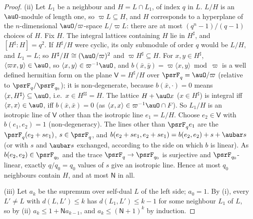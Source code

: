 \documentclass[10pt]{amsart}
\theoremstyle{definition}
\theoremstyle{remark}
\begin{document}
\begin{proof}
(ii) Let $L_1$ be a neighbour and $H=L\cap L_1$, of index $q$ in $L$. $L/H$ is an $\auO$-module of
length one, so $\varpi L\subseteq H$, and $H$ corresponds to a hyperplane of the $n$-dimensional
$\auO/\varpi$-space $L/\varpi L$: there are at most $(q^n-1)/(q-1)$ choices of $H$. Fix $H$. The
integral lattices containing $H$ lie in $H^\sharp$, and $[H^\sharp:H]=q^2$. If $H^\sharp/H$ were
cyclic, its only submodule of order $q$ would be $L/H$, and $L_1=L$; so $H^\sharp/H\cong(\auO/\varpi)^2$
and $\varpi H^\sharp\subseteq H$. For $x,y\in H^\sharp$, $\langle\varpi x,y\rangle\in\auO$, so
$\langle x,y\rangle\in\varpi^{-1}\auO$, and $b(\bar x,\bar y)=\varpi\langle x,y\rangle\bmod\varpi$ is a
well defined hermitian form on the plane $\mathsf V=H^\sharp/H$ over $\psrF_q=\auO/\varpi$ (relative to
$\psrF_q/\psrF_{q_0}$); it is non-degenerate, because $b(\bar x,\cdot)=0$ means $\langle x,
H^\sharp\rangle\subseteq\auO$, i.e.\ $x\in H^{\sharp\sharp}=H$. The lattice $H+\auO x$ ($x\in H^\sharp$)
is integral iff $\langle x,x\rangle\in\auO$, iff $b(\bar x,\bar x)=0$ (as $\langle x,x\rangle\in
\varpi^{-1}\auO\cap F$). So $L_1/H$ is an isotropic line of $\mathsf V$ other than the isotropic line
$e_1=L/H$. Choose $e_2\in\mathsf V$ with $b(e_1,e_2)=1$ (non-degeneracy). The lines other than $\psrF_q e_1$ are
the $\psrF_q(e_2+se_1)$, $s\in\psrF_q$, and $b(e_2+se_1,e_2+se_1)=b(e_2,e_2)+s+\aubar s$ (or with $s$
and $\aubar s$ exchanged, according to the side on which $b$ is linear). As $b(e_2,e_2)\in\psrF_{q_0}$ and
the trace $\psrF_q\to\psrF_{q_0}$ is surjective and $\psrF_{q_0}$-linear, exactly $q/q_0=q_0$ values of $s$
give an isotropic line. Hence at most $q_0$ neighbours contain $H$, and at most $\mathsf N$ in all.

(iii) Let $a_k$ be the supremum over self-dual $L$ of the left side; $a_0=1$. By (i), every $L'\ne L$
with $d(L,L')\le k$ has $d(L_1,L')\le k-1$ for some neighbour $L_1$ of $L$, so by (ii)
$a_k\le1+\mathsf Na_{k-1}$, and $a_k\le(\mathsf N+1)^k$ by induction.
\end{proof}
\end{document}
